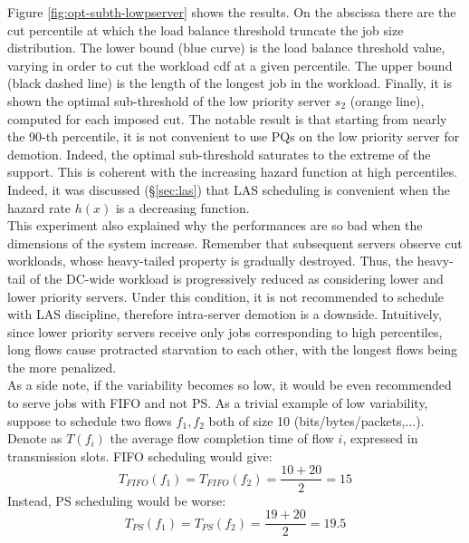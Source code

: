 Figure \ref{fig:opt-subth-lowpserver} shows the results. On the abscissa there are the cut percentile at which the load balance threshold truncate the job size distribution. The lower bound (blue curve) is the load balance threshold value, varying in order to cut the workload cdf at a given percentile.  The upper bound (black dashed line) is the length of the longest job in the workload. Finally, it is shown the optimal sub-threshold of the low priority server $s_2$ (orange line), computed for each imposed cut. The notable result is that starting from nearly the 90-th percentile, it is not convenient to use PQs on the low priority server for demotion. Indeed, the optimal sub-threshold saturates to the extreme of the support. This is coherent with the increasing hazard function at high percentiles. Indeed, it was discussed (\S \ref{sec:las}) that LAS scheduling is convenient when the hazard rate $h(x)$ is a decreasing function.\\
This experiment also explained why the performances are so bad when the dimensions of the system increase. Remember that subsequent servers observe cut workloads, whose heavy-tailed property is gradually destroyed. Thus, the heavy-tail of the DC-wide workload is progressively reduced as considering lower and lower priority servers. Under this condition, it is not recommended to schedule with LAS discipline, therefore intra-server demotion is a downside. Intuitively, since lower priority servers receive only jobs corresponding to high percentiles, long flows cause protracted starvation to each other, with the longest flows being the more penalized. \\
As a side note, if the variability becomes so low, it would be even recommended to serve jobs with FIFO and not PS. As a trivial example of low variability, suppose to schedule two flows $f_1, f_2$ both of size 10 (bits/bytes/packets,...). Denote as $T(f_i)$ the average flow completion time of flow $i$, expressed in transmission slots. FIFO scheduling would give:
\[
	T_{FIFO}(f_1) = T_{FIFO}(f_2) = \dfrac{10+20}{2} = 15
\]
Instead, PS scheduling would be worse:
\[
T_{PS}(f_1) = T_{PS}(f_2) = \dfrac{19+20}{2} = 19.5
\]

